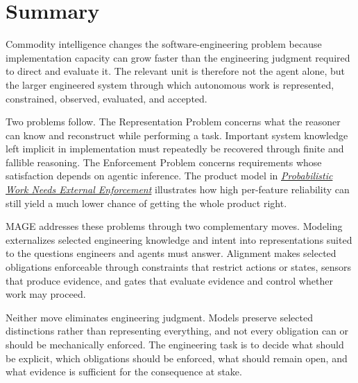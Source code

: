 




\chapter{Summary}

Commodity intelligence changes the software-engineering problem because implementation capacity can grow faster than the engineering judgment required to direct and evaluate it. The relevant unit is therefore not the agent alone, but the larger engineered system through which autonomous work is represented, constrained, observed, evaluated, and accepted.

Two problems follow. The Representation Problem concerns what the reasoner can know and reconstruct while performing a task. Important system knowledge left implicit in implementation must repeatedly be recovered through finite and fallible reasoning. The Enforcement Problem concerns requirements whose satisfaction depends on agentic inference. The product model in \hyperref[1.4-the-agentic-substrate:heading:probabilistic-work-needs-external-enforcement]{\emph{Probabilistic Work Needs External Enforcement}} illustrates how high per-feature reliability can still yield a much lower chance of getting the whole product right.

MAGE addresses these problems through two complementary moves. Modeling externalizes selected engineering knowledge and intent into representations suited to the questions engineers and agents must answer. Alignment makes selected obligations enforceable through constraints that restrict actions or states, sensors that produce evidence, and gates that evaluate evidence and control whether work may proceed.

Neither move eliminates engineering judgment. Models preserve selected distinctions rather than representing everything, and not every obligation can or should be mechanically enforced. The engineering task is to decide what should be explicit, which obligations should be enforced, what should remain open, and what evidence is sufficient for the consequence at stake.
